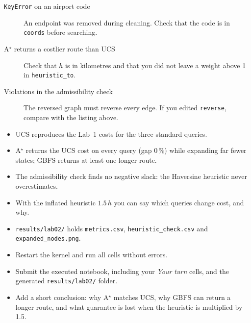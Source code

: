 \begin{troubleshoot}
\begin{description}
  \item[\texttt{KeyError} on an airport code] An endpoint was removed during cleaning. Check that the code is in \texttt{coords} before searching.
  \item[A$^\star$ returns a costlier route than UCS] Check that $h$ is in kilometres and that you did not leave a weight above 1 in \texttt{heuristic\_to}.
  \item[Violations in the admissibility check] The reversed graph must reverse every edge. If you edited \texttt{reverse}, compare with the listing above.
\end{description}
\end{troubleshoot}

\begin{verification}
\begin{itemize}
  \item UCS reproduces the Lab~1 costs for the three standard queries.
  \item A$^\star$ returns the UCS cost on every query (gap 0\,\%) while expanding far fewer states; GBFS returns at least one longer route.
  \item The admissibility check finds no negative slack: the Haversine heuristic never overestimates.
  \item With the inflated heuristic $1.5\,h$ you can say which queries change cost, and why.
  \item \texttt{results/lab02/} holds \texttt{metrics.csv}, \texttt{heuristic\_check.csv} and \texttt{expanded\_nodes.png}.
\end{itemize}
\end{verification}

\begin{labdeliverable}
\begin{itemize}
  \item Restart the kernel and run all cells without errors.
  \item Submit the executed notebook, including your \emph{Your turn} cells, and the generated \texttt{results/lab02/} folder.
  \item Add a short conclusion: why A$^\star$ matches UCS, why GBFS can return a longer route, and what guarantee is lost when the heuristic is multiplied by 1.5.
\end{itemize}
\end{labdeliverable}
